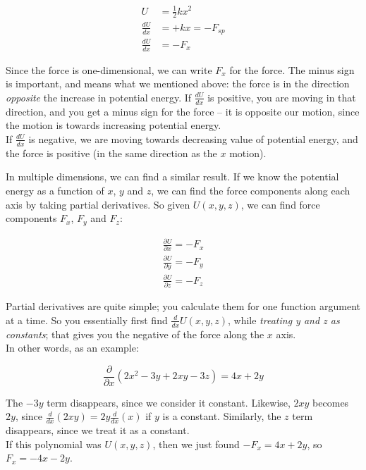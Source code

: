 \documentclass[8.01x]{subfiles}
\begin{document}
\begin{align}
U &= \frac{1}{2} k x^2\\
\frac{dU}{dx} &= + k x = - F_{sp}\\
\frac{dU}{dx} &= -F_x
\end{align}

Since the force is one-dimensional, we can write $F_x$ for the force. The minus sign is important, and means what we mentioned above: the force is in the direction \emph{opposite} the increase in potential energy. If $\frac{dU}{dx}$ is positive, you are moving in that direction, and you get a minus sign for the force -- it is opposite our motion, since the motion is towards increasing potential energy.\\
If $\frac{dU}{dx}$ is negative, we are moving towards decreasing value of potential energy, and the force is positive (in the same direction as the $x$ motion).

In multiple dimensions, we can find a similar result. If we know the potential energy as a function of $x$, $y$ and $z$, we can find the force components along each axis by taking partial derivatives. So given $U(x, y, z)$, we can find force components $F_x$, $F_y$ and $F_z$:

\begin{align}
\frac{\partial U}{\partial x} = - F_x\\
\frac{\partial U}{\partial y} = - F_y\\
\frac{\partial U}{\partial z} = - F_z
\end{align}

Partial derivatives are quite simple; you calculate them for one function argument at a time. So you essentially first find $\displaystyle \frac{d}{dx} U(x,y,z)$, while \emph{treating y and z as constants}; that gives you the negative of the force along the $x$ axis.\\
In other words, as an example:

\begin{equation}
\frac{\partial}{\partial x}\left(2x^2 - 3y + 2 x y - 3z\right) = 4x + 2y
\end{equation}

The $-3 y$ term disappears, since we consider it constant. Likewise, $2 x y$ becomes $2 y$, since $\displaystyle \frac{d}{dx}(2 x y) = 2 y \frac{d}{dx} (x)$ if $y$ is a constant. Similarly, the $z$ term disappears, since we treat it as a constant.\\
If this polynomial was $U(x, y, z)$, then we just found $-F_x = 4x + 2 y$, so $F_x = -4 x - 2 y$.
\end{document}
